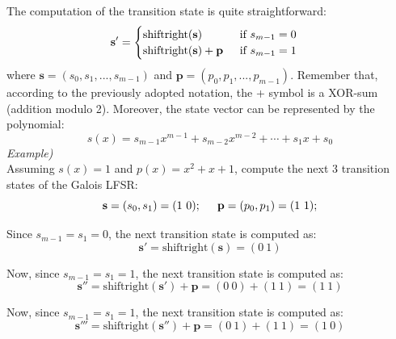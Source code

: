 \documentclass[11pt, a4paper]{article}
\begin{document}
The computation of the transition state is quite straightforward:
\begin{equation*}
    \textbf{s}'=
    \begin{cases}
      \text{shiftright}(\textbf{s})\ \ \ \ \ \ \ \ \ \ \text{if}\ s_{m-1}=0\\
      \text{shiftright}(\textbf{s})+\textbf{p}\ \ \ \ \hspace{0.05cm}\text{if}\ s_{m-1}=1
    \end{cases}
\end{equation*}
where $\textbf{s}=(s_0,s_1,...,s_{m-1})$ and $\textbf{p}=(p_0,p_1,...,p_{m-1})$. Remember that, according to the previously adopted notation, the + symbol is a XOR-sum (addition modulo 2). Moreover, the state vector can be represented by the polynomial:
$$s(x)=s_{m-1}x^{m-1}+s_{m-2}x^{m-2}+\cdots+s_1x+s_0$$
\textit{Example)}\\

Assuming $s(x)=1$ and $p(x)=x^2+x+1$, compute the next 3 transition states of the Galois LFSR:
$$\textbf{s}=(s_0,s_1)=(1\ 0);\hspace{0.5cm}\textbf{p}=(p_0,p_1)=(1\ 1);$$

Since $s_{m-1}=s_{1}=0$, the next transition state is computed as:
$$\textbf{s}'=\text{shiftright}(\textbf{s})=(0\ 1)$$

Now, since $s_{m-1}=s_{1}=1$, the next transition state is computed as:
$$\textbf{s}''=\text{shiftright}(\textbf{s}')+\textbf{p}=(0\ 0)+(1\ 1)=(1\ 1)$$

Now, since $s_{m-1}=s_{1}=1$, the next transition state is computed as:
$$\textbf{s}'''=\text{shiftright}(\textbf{s}'')+\textbf{p}=(0\ 1)+(1\ 1)=(1\ 0)$$
\end{document}
